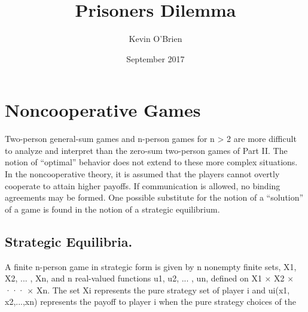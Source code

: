 \documentclass{article}
\title{Prisoners Dilemma}
\author{Kevin O'Brien}
\date{September 2017}
\begin{document}
\section{Noncooperative Games}
Two-person general-sum games and n-person games for n > 2 are more difficult to
analyze and interpret than the zero-sum two-person games of Part II. The notion of “optimal”
behavior does not extend to these more complex situations. In the noncooperative
theory, it is assumed that the players cannot overtly cooperate to attain higher payoffs. If
communication is allowed, no binding agreements may be formed. One possible substitute
for the notion of a “solution” of a game is found in the notion of a strategic equilibrium.

\subsection{Strategic Equilibria.} A finite n-person game in strategic form is given by n
nonempty finite sets, X1, X2, ... , Xn, and n real-valued functions u1, u2, ... , un, defined
on X1 × X2 × ··· × Xn. The set Xi represents the pure strategy set of player i and
ui(x1, x2,...,xn) represents the payoff to player i when the pure strategy choices of the
\end{document}
